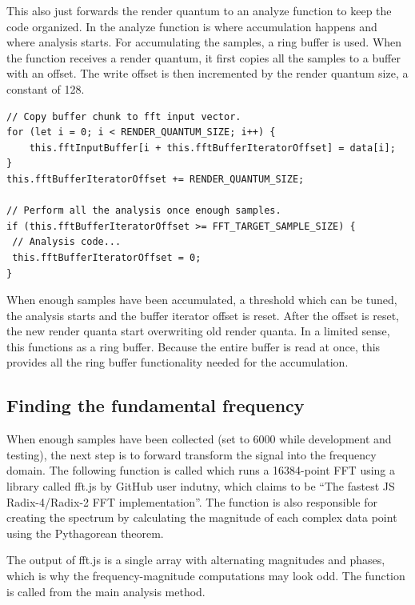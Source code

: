 

This also just forwards the render quantum to an analyze function to keep the code organized. In the analyze function is where accumulation happens and where analysis starts. For accumulating the samples, a ring buffer is used. When the function receives a render quantum, it first copies all the samples to a buffer with an offset. The write offset is then incremented by the render quantum size, a constant of 128.

\begin{lstlisting}[style=javascript]
// Copy buffer chunk to fft input vector.
for (let i = 0; i < RENDER_QUANTUM_SIZE; i++) {
    this.fftInputBuffer[i + this.fftBufferIteratorOffset] = data[i];
}
this.fftBufferIteratorOffset += RENDER_QUANTUM_SIZE;

// Perform all the analysis once enough samples.
if (this.fftBufferIteratorOffset >= FFT_TARGET_SAMPLE_SIZE) {
 // Analysis code...
 this.fftBufferIteratorOffset = 0;
}
\end{lstlisting}
When enough samples have been accumulated, a threshold which can be tuned, the analysis starts and the buffer iterator offset is reset. After the offset is reset, the new render quanta start overwriting old render quanta. In a limited sense, this functions as a ring buffer. Because the entire buffer is read at once, this provides all the ring buffer functionality needed for the accumulation. 

\subsection{Finding the fundamental frequency}
When enough samples have been collected (set to 6000 while development and testing), the next step is to forward transform the signal into the frequency domain. The following function is called which runs a 16384-point FFT using a library called fft.js by GitHub user indutny, which claims to be “The fastest JS Radix-4/Radix-2 FFT implementation”. The function is also responsible for creating the spectrum by calculating the magnitude of each complex data point using the Pythagorean theorem. 



The output of fft.js is a single array with alternating magnitudes and phases, which is why the frequency-magnitude computations may look odd. The function is called from the main analysis method.


